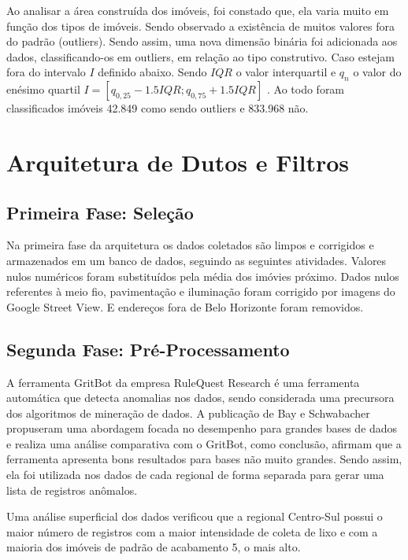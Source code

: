 \documentclass[12pt]{article}
\begin{document}
Ao analisar a área construída dos imóveis, foi constado que, ela varia muito em função dos tipos de imóveis. Sendo observado a existência de muitos valores fora do padrão (outliers). Sendo assim, uma nova dimensão binária foi adicionada aos dados, classificando-os em outliers, em relação ao tipo construtivo. Caso estejam fora do intervalo $I$ definido abaixo. Sendo $IQR$ o valor interquartil e $q_n$ o valor do enésimo quartil $I = \left[ q_{0,25} - 1.5IQR;q_{0,75} + 1.5IQR  \right]$ . Ao todo foram classificados imóveis 42.849 como sendo outliers e 833.968 não. 

\section{Arquitetura de Dutos e Filtros}

\subsection{Primeira Fase: Seleção}


Na primeira fase da arquitetura os dados coletados são limpos e corrigidos e armazenados em um banco de dados, seguindo as seguintes atividades. Valores nulos numéricos foram substituídos pela média dos imóvies próximo. Dados nulos referentes à meio fio, pavimentação e iluminação foram corrigido por imagens do Google Street View. E endereços fora de Belo Horizonte foram removidos.

\subsection{Segunda Fase: Pré-Processamento}

A ferramenta GritBot da empresa RuleQuest Research é uma ferramenta automática que detecta anomalias nos dados, sendo considerada uma precursora dos algoritmos de mineração de dados. A publicação de Bay e Schwabacher \cite{bay2003mining} propuseram uma abordagem focada no desempenho para grandes bases de dados e realiza uma análise comparativa com o GritBot, como conclusão, afirmam que a ferramenta apresenta bons resultados para bases não muito grandes. Sendo assim, ela foi utilizada nos dados de cada regional de forma separada para gerar uma lista de registros anômalos. 

Uma análise superficial dos dados verificou que a regional Centro-Sul possui o maior número de registros com a maior intensidade de coleta de lixo e com a maioria dos imóveis de padrão de acabamento 5, o mais alto.
\end{document}
